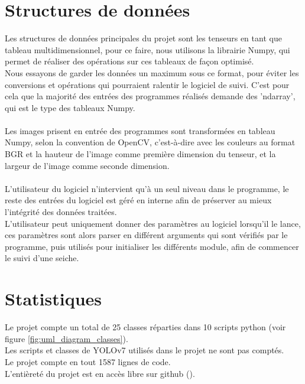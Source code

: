 \section{Structures de données}
Les structures de données principales du projet sont les tenseurs en tant que tableau multidimensionnel, pour ce faire, nous utilisons la librairie Numpy, qui permet de réaliser des opérations sur ces tableaux de façon optimisé.\\
Nous essayons de garder les données un maximum sous ce format, pour éviter les conversions et opérations qui pourraient ralentir le logiciel de suivi. C'est pour cela que la majorité des entrées des programmes réalisés demande des 'ndarray', qui est le type des tableaux Numpy.\\
\\
Les images prisent en entrée des programmes sont transformées en tableau Numpy, selon la convention de OpenCV, c'est-à-dire avec les couleurs au format BGR et la hauteur de l'image comme première dimension du tenseur, et la largeur de l'image comme seconde dimension.\\
\\
L'utilisateur du logiciel n'intervient qu'à un seul niveau dans le programme, le reste des entrées du logiciel est géré en interne afin de préserver au mieux l'intégrité des données traitées.\\
L'utilisateur peut uniquement donner des paramètres au logiciel lorsqu'il le lance, ces paramètres sont alors parser en différent arguments qui sont vérifiés par le programme, puis utilisés pour initialiser les différents module, afin de commencer le suivi d'une seiche.




\section{Statistiques}
Le projet compte un total de 25 classes réparties dans 10 scripts python (voir figure \ref{fig:uml_diagram_classes}).\\
Les scripts et classes de YOLOv7\cite{wang_yolov7_nodate} utilisés dans le projet ne sont pas comptés.\\
Le projet compte en tout 1587 lignes de code.\\
L'entièreté du projet est en accès libre sur github (\cite{pp2pf}).

\clearpage